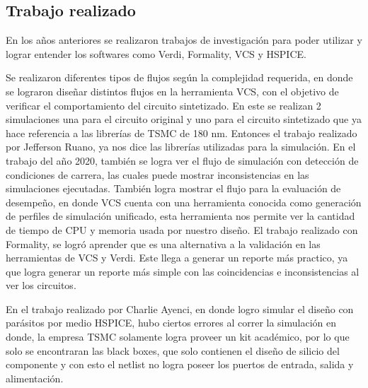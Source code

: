 \cite{charls} 



\subsection*{Trabajo realizado}

En los años anteriores se realizaron trabajos de investigación para poder utilizar y lograr entender los softwares como Verdi, Formality, VCS y HSPICE.

Se realizaron diferentes tipos de flujos según la complejidad requerida, en donde se lograron diseñar distintos flujos en la herramienta VCS, con el objetivo de verificar el comportamiento del circuito sintetizado. En este se realizan 2 simulaciones una para el circuito original y uno para el circuito sintetizado que ya hace referencia a las librerías de TSMC de 180 nm. Entonces el trabajo realizado por Jefferson Ruano, ya nos dice las librerías utilizadas para la simulación. En el trabajo del año 2020, también se logra ver el flujo de simulación con detección de condiciones de carrera, las cuales puede mostrar inconsistencias en las simulaciones ejecutadas. También logra mostrar el flujo para la evaluación de desempeño, en donde VCS cuenta con una herramienta conocida como generación de perfiles de simulación unificado, esta herramienta nos permite ver la cantidad de tiempo de CPU y memoria usada por nuestro diseño. 
El trabajo realizado con Formality, se logró aprender que es una alternativa a la validación en las herramientas de VCS y Verdi. Este llega a generar un reporte más practico, ya que logra generar un reporte más simple con las coincidencias e inconsistencias al ver los circuitos.

En el trabajo realizado por Charlie Ayenci, en donde logro simular el diseño con parásitos por medio HSPICE, hubo ciertos errores al correr la simulación en donde, la empresa TSMC solamente logra proveer un kit académico, por lo que solo se encontraran las black boxes, que solo contienen el diseño de silicio del componente y con esto el netlist no logra poseer los puertos de entrada, salida y alimentación.  

 \cite{charls} 
  \cite{Jeff} 